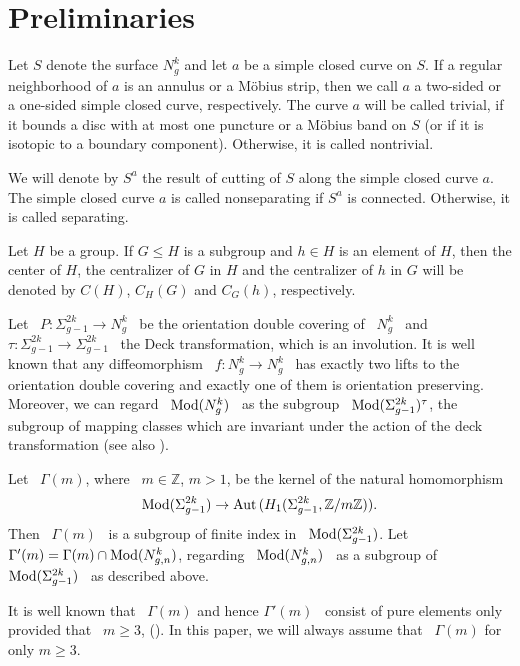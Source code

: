 \documentclass[11 pt]{amsart}
\theoremstyle{definition}
\begin{document}
\section{Preliminaries}\label{Prelim}

Let $S$ denote the surface  $N_{g}^k$ and let $a$ be a simple closed
curve on $S$. If a regular neighborhood of $a$ is an annulus or a
M\"obius strip, then we call $a$ a two-sided or a one-sided simple
closed curve, respectively. The curve $a$ will be called trivial, if
it bounds a disc with at most one puncture or a M\"obius band on $S$
(or if it is isotopic to a boundary component). Otherwise, it is
called nontrivial.

We will denote by  $S^a$ the result of cutting of $S$ along the
simple closed curve $a$. The simple closed curve $a$ is called
nonseparating if $S^a$ is connected. Otherwise, it is called
separating.

Let $H$ be a group. If $G\leq H$ is a subgroup and $h\in H$ is an
element of $H$, then the center of $H$, the centralizer of $G$ in
$H$ and the centralizer of $h$ in $G$ will be denoted by $C(H)$,
$C_H(G)$ and $C_G(h)$, respectively.

Let \ $P: \Sigma_{g-1}^{2k}\rightarrow N_{g}^k$ \ be the orientation double
covering of  \ $N_{g}^k$ \ and \ $\tau:\Sigma_{g-1}^{2k}\rightarrow\Sigma_{g-1}^{2k}$ \ the
Deck transformation, which is an involution.  It is well known that any diffeomorphism \
$f:N_g^k\rightarrow N_g^k$ \ has exactly two lifts to the orientation double
covering and exactly one of them is orientation preserving. Moreover, we can regard
\ ${\rm Mod}(N_g^k)$ \ as the
subgroup \ ${\rm Mod}(\Sigma_{g-1}^{2k})^\tau$, the subgroup of mapping classes which
are invariant under the action of the deck transformation (see also \cite{A}).

Let \ $\Gamma(m)$, where \ $m \in \mathbb{Z}$, $m>1$, be the kernel of
the natural homomorphism $${\rm Mod}(\Sigma_{g-1}^{2k})
\rightarrow {\rm Aut} \,(H_{1}(\Sigma_{g-1}^{2k}, \mathbb{Z} / m
\mathbb{Z})).$$ Then \ $\Gamma(m)$ \ is a subgroup of finite index in \
${\rm Mod}(\Sigma_{g-1}^{2k})$. Let \ $\Gamma'(m)=\Gamma(m) \cap
{\rm Mod}(N_{g,n}^k)$, regarding \ ${\rm Mod}(N_{g,n}^k)$ \ as a
subgroup of \ ${\rm Mod}(\Sigma_{g-1}^{2k})$ \ as described above.

It is well known that \ $\Gamma(m)$ and hence $\Gamma'(m)$ \ consist of
pure elements only provided that \ $m\geq 3$, (\cite{I1}). In this
paper, we will always assume that \ $\Gamma(m)$ for only $m\geq 3$.
\end{document}
